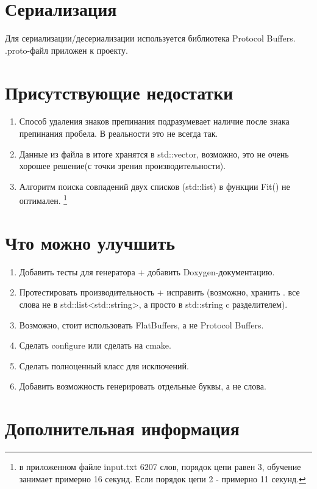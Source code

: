 \documentclass[a4paper]{article}
\begin{document}
\section{Сериализация}
Для сериализации/десериализации используется библиотека Protocol Buffers.\\
.proto-файл приложен к проекту.


\section{Присутствующие недостатки}
\begin{enumerate}
	\item Способ удаления знаков препинания подразумевает наличие после знака препинания пробела. В реальности это не всегда так.
	\item Данные из файла в итоге хранятся в std::vector, возможно, это не очень хорошее решение(с точки зрения производительности).
	\item Алгоритм поиска совпадений двух списков (std::list) в функции Fit() не оптимален.
	 \footnote {в приложенном файле input.txt 6207 слов, порядок цепи равен 3, обучение занимает примерно 16 секунд. Если порядок цепи 2 - примерно 11 секунд.}
\end{enumerate}

\section{Что можно улучшить}
\begin{enumerate}
	\item Добавить тесты для генератора + добавить Doxygen-документацию.
	\item Протестировать производительность + исправить (возможно, хранить .
		все слова не в std::list<std::string>, а просто в std::string c разделителем).
	\item Возможно, стоит использовать FlatBuffers, а не Protocol Buffers.
	\item Сделать configure или сделать на cmake.
	\item Сделать полноценный класс для исключений.
	\item Добавить возможность генерировать отдельные буквы, а не слова.

\end{enumerate}
\section{Дополнительная информация}
\end{document}
